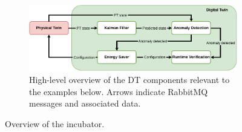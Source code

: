 \begin{figure}[ht]
	\begin{subfigure}[t]{0.9\textwidth}
		\centering
		\includegraphics[width=\textwidth]{images/incubator_anomaly_HL.pdf}
		\caption{High-level overview of the DT components relevant to the examples below. Arrows indicate RabbitMQ messages and associated data.}
		\label{subfig:incubator_anomaly}
	\end{subfigure}
	\caption{Overview of the incubator.}
	\label{fig:incubator}
\end{figure}

